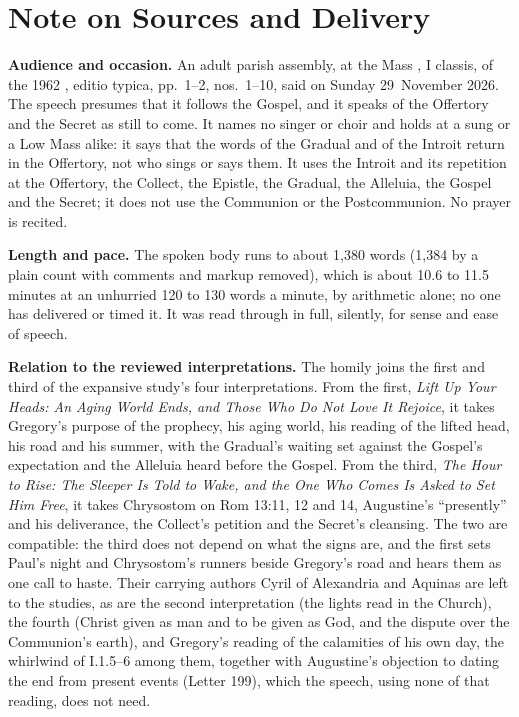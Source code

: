 
\section*{Note on Sources and Delivery}

{\footnotesize

\textbf{Audience and occasion.} An adult parish assembly, at the Mass
, I classis, of the 1962 , editio typica, pp.~1--2, nos.~1--10, said on Sunday 29~November
2026. The speech presumes that it follows the Gospel, and it speaks of the
Offertory and the Secret as still to come. It names no singer or choir and
holds at a sung or a Low Mass alike: it says that the words of the Gradual and
of the Introit return in the Offertory, not who sings or says them. It uses
the Introit and its repetition at the Offertory, the Collect, the Epistle, the
Gradual, the Alleluia, the Gospel and the Secret; it does not use the
Communion or the Postcommunion. No prayer is recited.

\textbf{Length and pace.} The spoken body runs to about 1,380 words (1,384 by
a plain count with comments and markup removed), which is about 10.6 to 11.5
minutes at an unhurried 120 to 130 words a minute, by arithmetic alone; no one
has delivered or timed it. It was read through in full, silently, for sense
and ease of speech.

\textbf{Relation to the reviewed interpretations.} The homily joins the first
and third of the expansive study's four interpretations. From the first,
\textit{Lift Up Your Heads: An Aging World Ends, and Those Who Do Not Love It
Rejoice}, it takes Gregory's purpose of the prophecy, his aging world, his
reading of the lifted head, his road and his summer, with the Gradual's
waiting set against the Gospel's expectation and the Alleluia heard before the
Gospel. From the third, \textit{The Hour to Rise: The Sleeper Is Told to Wake,
and the One Who Comes Is Asked to Set Him Free}, it takes Chrysostom on Rom
13:11, 12 and 14, Augustine's ``presently'' and his deliverance, the Collect's
petition and the Secret's cleansing. The two are compatible: the third does
not depend on what the signs are, and the first sets Paul's night and
Chrysostom's runners beside Gregory's road and hears them as one call to
haste. Their carrying authors Cyril of Alexandria and Aquinas are left to the
studies, as are the second interpretation (the lights read in the Church), the
fourth (Christ given as man and to be given as God, and the dispute over the
Communion's earth), and Gregory's reading of the calamities of his own day,
the whirlwind of I.1.5--6 among them, together with Augustine's objection to
dating the end from present events (Letter 199), which the speech, using none
of that reading, does not need.

}
